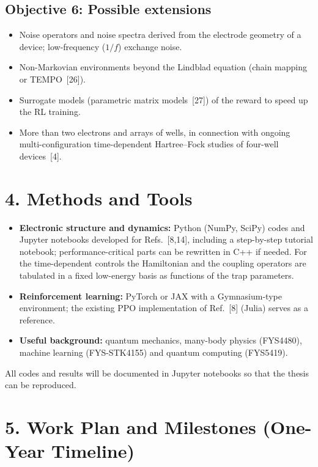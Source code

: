 \documentclass[12pt,a4paper]{article}
\begin{document}
\subsection*{Objective 6: Possible extensions}
\begin{itemize}
  \item Noise operators and noise spectra derived from the electrode
  geometry of a device; low-frequency ($1/f$) exchange noise.
  \item Non-Markovian environments beyond the Lindblad equation
  (chain mapping or TEMPO~[26]).
  \item Surrogate models (parametric matrix models~[27]) of the reward to
  speed up the RL training.
  \item More than two electrons and arrays of wells, in connection
  with ongoing multi-configuration time-dependent Hartree--Fock
  studies of four-well devices~[4].
\end{itemize}

\section*{4. Methods and Tools}

\begin{itemize}
  \item \textbf{Electronic structure and dynamics:} Python (NumPy,
  SciPy) codes and Jupyter notebooks developed for Refs.~[8,14],
  including a step-by-step tutorial notebook; performance-critical
  parts can be rewritten in C++ if needed.  For the time-dependent
  controls the Hamiltonian and the coupling operators are tabulated in
  a fixed low-energy basis as functions of the trap parameters.
  \item \textbf{Reinforcement learning:} PyTorch or JAX with a
  Gymnasium-type environment; the existing PPO implementation of
  Ref.~[8] (Julia) serves as a reference.
  \item \textbf{Useful background:} quantum mechanics, many-body
  physics (FYS4480), machine learning (FYS-STK4155) and quantum
  computing (FYS5419).
\end{itemize}
All codes and results will be documented in Jupyter notebooks so that
the thesis can be reproduced.

\section*{5. Work Plan and Milestones (One-Year Timeline)}
\end{document}
